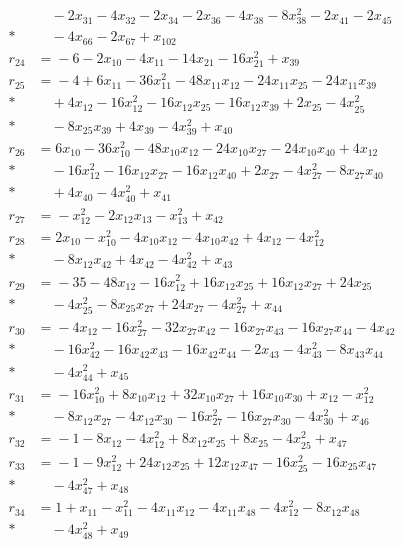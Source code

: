 \documentclass[11pt]{article}
\theoremstyle{remark}\newtheorem{remark}[theorem]{Remark}
\begin{document}
\begin{align*}
&\quad{}-2x_{31}-4x_{32}-2x_{34}-2x_{36}-4x_{38}-8x_{38}^{2}-2x_{41}-2x_{45}\\*
&\quad{}-4x_{66}-2x_{67}+x_{102}\\[2pt]
r_{24}&={}-6-2x_{10}-4x_{11}-14x_{21}-16x_{21}^{2}+x_{39}\\[2pt]
r_{25}&={}-4+6x_{11}-36x_{11}^{2}-48x_{11}x_{12}-24x_{11}x_{25}-24x_{11}x_{39}\\*
&\quad{}+4x_{12}-16x_{12}^{2}-16x_{12}x_{25}-16x_{12}x_{39}+2x_{25}-4x_{25}^{2}\\*
&\quad{}-8x_{25}x_{39}+4x_{39}-4x_{39}^{2}+x_{40}\\[2pt]
r_{26}&={}6x_{10}-36x_{10}^{2}-48x_{10}x_{12}-24x_{10}x_{27}-24x_{10}x_{40}+4x_{12}\\*
&\quad{}-16x_{12}^{2}-16x_{12}x_{27}-16x_{12}x_{40}+2x_{27}-4x_{27}^{2}-8x_{27}x_{40}\\*
&\quad{}+4x_{40}-4x_{40}^{2}+x_{41}\\[2pt]
r_{27}&={}-x_{12}^{2}-2x_{12}x_{13}-x_{13}^{2}+x_{42}\\[2pt]
r_{28}&={}2x_{10}-x_{10}^{2}-4x_{10}x_{12}-4x_{10}x_{42}+4x_{12}-4x_{12}^{2}\\*
&\quad{}-8x_{12}x_{42}+4x_{42}-4x_{42}^{2}+x_{43}\\[2pt]
r_{29}&={}-35-48x_{12}-16x_{12}^{2}+16x_{12}x_{25}+16x_{12}x_{27}+24x_{25}\\*
&\quad{}-4x_{25}^{2}-8x_{25}x_{27}+24x_{27}-4x_{27}^{2}+x_{44}\\[2pt]
r_{30}&={}-4x_{12}-16x_{27}^{2}-32x_{27}x_{42}-16x_{27}x_{43}-16x_{27}x_{44}-4x_{42}\\*
&\quad{}-16x_{42}^{2}-16x_{42}x_{43}-16x_{42}x_{44}-2x_{43}-4x_{43}^{2}-8x_{43}x_{44}\\*
&\quad{}-4x_{44}^{2}+x_{45}\\[2pt]
r_{31}&={}-16x_{10}^{2}+8x_{10}x_{12}+32x_{10}x_{27}+16x_{10}x_{30}+x_{12}-x_{12}^{2}\\*
&\quad{}-8x_{12}x_{27}-4x_{12}x_{30}-16x_{27}^{2}-16x_{27}x_{30}-4x_{30}^{2}+x_{46}\\[2pt]
r_{32}&={}-1-8x_{12}-4x_{12}^{2}+8x_{12}x_{25}+8x_{25}-4x_{25}^{2}+x_{47}\\[2pt]
r_{33}&={}-1-9x_{12}^{2}+24x_{12}x_{25}+12x_{12}x_{47}-16x_{25}^{2}-16x_{25}x_{47}\\*
&\quad{}-4x_{47}^{2}+x_{48}\\[2pt]
r_{34}&={}1+x_{11}-x_{11}^{2}-4x_{11}x_{12}-4x_{11}x_{48}-4x_{12}^{2}-8x_{12}x_{48}\\*
&\quad{}-4x_{48}^{2}+x_{49}\\[2pt]

\end{align*}
\end{document}
